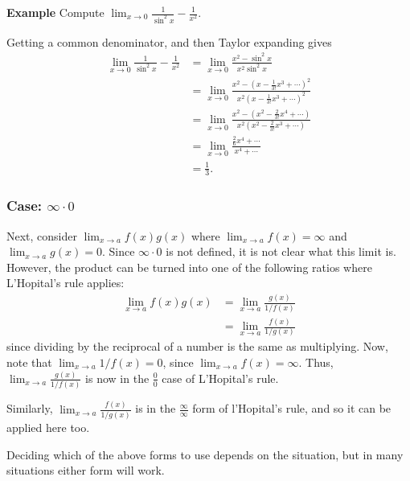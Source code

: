 \documentclass[twoside,openright,titlepage,a4paper]{book}
\begin{document}
\begin{sloppypar}
\textbf{Example} Compute $\displaystyle \lim_{x \rightarrow 0} \frac{1}{\sin^2 x} - \frac{1}{x^2}$. 
\begin{examplebox}
Getting a common denominator, and then Taylor expanding gives
\begin{align*}
\lim_{x \rightarrow 0} \frac{1}{\sin^2x} - \frac{1}{x^2} &= \lim_{x\rightarrow 0} \frac{x^2 - \sin^2x}{x^2 \sin^2x } \\
&= \lim_{ x\rightarrow 0} \frac{x^2 - \left(x-\frac{1}{3!}x^3 + \dotsb \right)^2}{x^2 \left(x- \frac{1}{3!}x^3 + \dotsb\right)^2} \\
&= \lim_{x \rightarrow 0} \frac{x^2 - \left(x^2 - \frac{2}{3!}x^4 + \dotsb\right)}{x^2 \left(x^2 - \frac{2}{3!}x^3 + \dotsb\right)} \\
&= \lim_{x \rightarrow 0} \frac{\frac{2}{6}x^4 + \dotsb}{x^4 + \dotsb} \\
&= \frac{1}{3}.
\end{align*}
\end{examplebox}

\subsubsection{Case: $\infty \cdot 0$}

Next, consider $\displaystyle \lim_{x \rightarrow a} f(x)g(x)$ where $\displaystyle \lim_{x \rightarrow a} f(x) = \infty$ and $\displaystyle \lim_{x \rightarrow a}g(x) = 0$. Since $\infty \cdot 0$ is not defined, it is not clear what this limit is. However, the product can be turned into one of the following ratios where L'Hopital's rule applies:
\begin{align*}
\lim_{x \rightarrow a} f(x)g(x) &= \lim_{x \rightarrow a} \frac{g(x)}{1/f(x)} \\
&= \lim_{x \rightarrow a} \frac{f(x)}{1/g(x)}
\end{align*}
since dividing by the reciprocal of a number is the same as multiplying. Now, note that $\displaystyle \lim_{x \rightarrow a} 1/f(x) = 0$, since $\displaystyle \lim_{x \rightarrow a} f(x) = \infty$. Thus, $ \displaystyle \lim_{x \rightarrow a} \frac{g(x)}{1/f(x)}$ is now in the $\frac{0}{0}$ case of L'Hopital's rule.

Similarly, $\displaystyle \lim_{x \rightarrow a} \frac{f(x)}{1/g(x)}$ is in the $\frac{\infty}{\infty}$ form of l'Hopital's rule, and so it can be applied here too.

Deciding which of the above forms to use depends on the situation, but in many situations either form will work.


\end{sloppypar}
\end{document}
